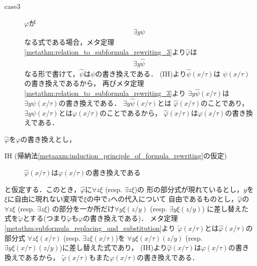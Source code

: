 \begin{metaprf}[第一]
\begin{description}
\begin{description}
					\item[case3] $\varphi$が
						\begin{align}
							\exists y \psi
						\end{align}
						なる式である場合，メタ定理\ref{metathm:relation_to_subformula_rewriting_3}より$\widehat{\varphi}$は
						\begin{align}
							\exists y \widehat{\psi}
						\end{align}
						なる形で書けて，$\widehat{\psi}$は$\psi$の書き換えである．
						(IH)より$\widehat{\psi}(x/\tau)$は
						$\psi(x/\tau)$の書き換えであるから，
						再びメタ定理\ref{metathm:relation_to_subformula_rewriting_3}より
						$\exists y \widehat{\psi}(x/\tau)$は
						$\exists y \psi(x/\tau)$の書き換えである．
						$\exists y \widehat{\psi}(x/\tau)$とは
						$\widehat{\varphi}(x/\tau)$のことであり，
						$\exists y \psi(x/\tau)$とは$\varphi(x/\tau)$のことであるから，
						$\widehat{\varphi}(x/\tau)$は$\varphi(x/\tau)$の書き換えである．
						\QED
				\end{description}
		\end{description}
	\end{metaprf}
	
	\begin{metaprf}[第二]
		$\widehat{\varphi}$を$\varphi$の書き換えとし，
		\begin{description}
			\item[IH (帰納法\ref{metaaxm:induction_principle_of_formula_rewriting}の仮定)]
				$\widehat{\varphi}(x/\tau)$は$\varphi(x/\tau)$の書き換えである
		\end{description}
		と仮定する．このとき，$\widehat{\varphi}$に$\forall z \xi$ (resp. $\exists z \xi$)の
		形の部分式が現れているとし，$y$を$\xi$に自由に現れない変項で$\xi$の中で$z$への代入について
		自由であるものとし，$\widehat{\varphi}$の$\forall z \xi$ (resp. $\exists z \xi$)
		の部分を一か所だけ$\forall y \xi(z/y)$ (resp. $\exists y \xi(z/y)$)
		に差し替えた式を$\widetilde{\varphi}$とする(つまり$\widetilde{\varphi}$も$\varphi$の書き換えである)．
		メタ定理\ref{metathm:subformula_replacing_and_substitution}より
		$\widetilde{\varphi}(x/\tau)$とは$\widehat{\varphi}(x/\tau)$の部分式
		$\forall z \xi(x/\tau)$ (resp. $\exists z \xi(x/\tau)$)を
		$\forall y \xi(x/\tau)(z/y)$ (resp. $\exists y \xi(x/\tau)(z/y)$)に差し替えた式であり，
		(IH)より$\widehat{\varphi}(x/\tau)$は$\varphi(x/\tau)$の書き換えであるから，
		$\widetilde{\varphi}(x/\tau)$もまた$\varphi(x/\tau)$の書き換えである．
		\QED
	\end{metaprf}
